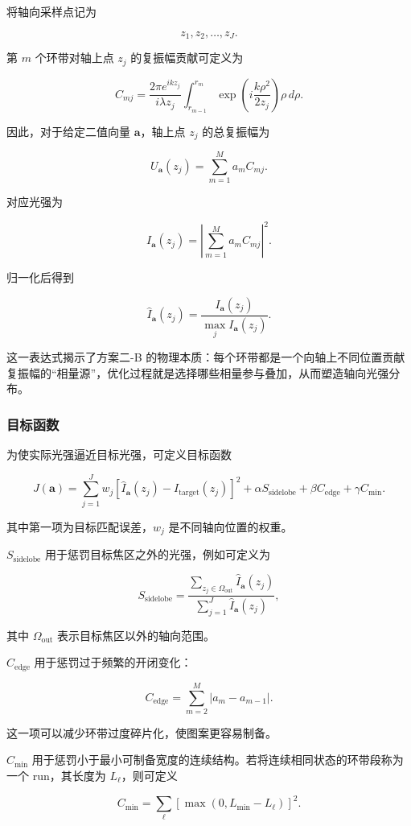 \documentclass[UTF8,a4paper,11pt]{ctexart}
\begin{document}
将轴向采样点记为

\[
z_1,z_2,\ldots,z_J.
\]

第 $m$ 个环带对轴上点 $z_j$ 的复振幅贡献可定义为

\[
C_{mj}
=
\frac{2\pi e^{ikz_j}}{i\lambda z_j}
\int_{r_{m-1}}^{r_m}
\exp\left(i\frac{k\rho^2}{2z_j}\right)
\rho\,d\rho.
\]

因此，对于给定二值向量 $\bm a$，轴上点 $z_j$ 的总复振幅为

\[
U_{\bm a}(z_j)
=
\sum_{m=1}^{M} a_m C_{mj}.
\]

对应光强为

\[
I_{\bm a}(z_j)=
\left|
\sum_{m=1}^{M} a_m C_{mj}
\right|^2.
\]

归一化后得到

\[
\widehat I_{\bm a}(z_j)
=
\frac{I_{\bm a}(z_j)}
{\max_j I_{\bm a}(z_j)}.
\]

这一表达式揭示了方案二-B 的物理本质：每个环带都是一个向轴上不同位置贡献复振幅的“相量源”，优化过程就是选择哪些相量参与叠加，从而塑造轴向光强分布。

\subsubsection{目标函数}

为使实际光强逼近目标光强，可定义目标函数

\[
J(\bm a)
=
\sum_{j=1}^{J}
w_j
\left[
\widehat I_{\bm a}(z_j)
-
I_{\mathrm{target}}(z_j)
\right]^2
+
\alpha S_{\mathrm{sidelobe}}
+
\beta C_{\mathrm{edge}}
+
\gamma C_{\mathrm{min}}.
\]

其中第一项为目标匹配误差，$w_j$ 是不同轴向位置的权重。

$S_{\mathrm{sidelobe}}$ 用于惩罚目标焦区之外的光强，例如可定义为

\[
S_{\mathrm{sidelobe}}
=
\frac{
\sum_{z_j\in \Omega_{\mathrm{out}}}
\widehat I_{\bm a}(z_j)
}{
\sum_{j=1}^{J}
\widehat I_{\bm a}(z_j)
},
\]

其中 $\Omega_{\mathrm{out}}$ 表示目标焦区以外的轴向范围。

$C_{\mathrm{edge}}$ 用于惩罚过于频繁的开闭变化：

\[
C_{\mathrm{edge}}
=
\sum_{m=2}^{M}
|a_m-a_{m-1}|.
\]

这一项可以减少环带过度碎片化，使图案更容易制备。

$C_{\mathrm{min}}$ 用于惩罚小于最小可制备宽度的连续结构。若将连续相同状态的环带段称为一个 run，其长度为 $L_\ell$，则可定义

\[
C_{\mathrm{min}}
=
\sum_{\ell}
\left[
\max(0,L_{\min}-L_\ell)
\right]^2.
\]
\end{document}
